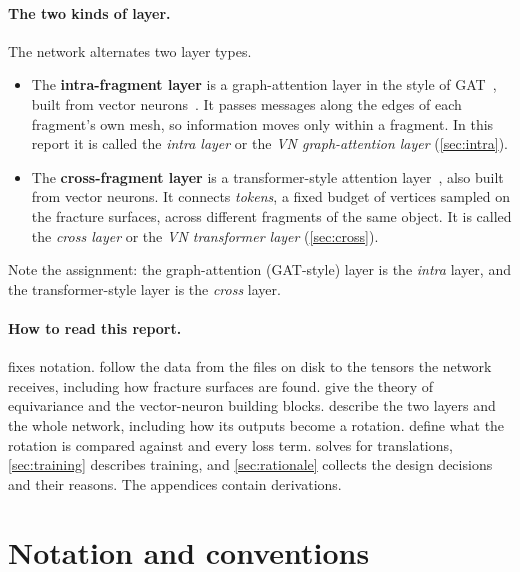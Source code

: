 \documentclass[11pt,a4paper]{article}
\theoremstyle{remark}
\begin{document}
\paragraph{The two kinds of layer.} The network alternates two layer types.
\begin{itemize}
  \item The \textbf{intra-fragment layer} is a graph-attention layer in the style of GAT~\cite{velickovic2018gat}, built from vector neurons~\cite{deng2021vn}. It passes messages along the edges of each fragment's own mesh, so information moves only within a fragment. In this report it is called the \emph{intra layer} or the \emph{VN graph-attention layer} (\cref{sec:intra}).
  \item The \textbf{cross-fragment layer} is a transformer-style attention layer~\cite{vaswani2017attention}, also built from vector neurons. It connects \emph{tokens}, a fixed budget of vertices sampled on the fracture surfaces, across different fragments of the same object. It is called the \emph{cross layer} or the \emph{VN transformer layer} (\cref{sec:cross}).
\end{itemize}
Note the assignment: the graph-attention (GAT-style) layer is the \emph{intra} layer, and the transformer-style layer is the \emph{cross} layer.

\paragraph{How to read this report.}  fixes notation.  follow the data from the files on disk to the tensors the network receives, including how fracture surfaces are found.  give the theory of equivariance and the vector-neuron building blocks.  describe the two layers and the whole network, including how its outputs become a rotation.  define what the rotation is compared against and every loss term.  solves for translations, \cref{sec:training} describes training, and \cref{sec:rationale} collects the design decisions and their reasons. The appendices contain derivations.

\section{Notation and conventions}
\label{sec:notation}
\end{document}
